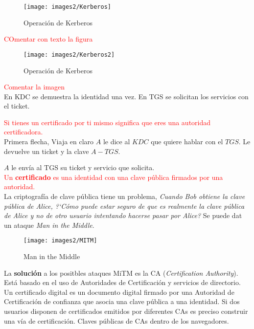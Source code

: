 \documentclass[10pt,portrait, twocolumn]{article}
\begin{document}
	\begin{figure}[ht!]
	\centering
	\texttt{[image: images2/Kerberos]}
	\caption{Operación de Kerberos}
	\label{figure:Planta1}
	\end{figure}
	
\textcolor{red}{COmentar con texto la figura}
	
		\begin{figure}[ht!]
	\centering
	\texttt{[image: images2/Kerberos2]}
	\caption{Operación de Kerberos}
	\label{figure:Planta1}
	\end{figure}
	
\textcolor{red}{Comentar la imagen}\\

En KDC se demuestra la identidad una vez. En TGS se solicitan los servicios con el ticket.

\textcolor{red}{Si tienes un certificado por ti mismo significa que eres una autoridad certificadora.}\\

Primera flecha, Viaja en claro $A$ le dice al $KDC$ que quiere hablar con el $TGS$. Le devuelve un ticket y la clave $A-TGS$.

\quad $A$ le envía al TGS su ticket y servicio que solicita.\\

\textcolor{red}{Un \textbf{certificado} es una identidad con una clave pública firmados por una autoridad.}\\

La criptografía de clave pública tiene un problema, \textit{Cuando Bob obtiene la clave pública de Alice, ?`Cómo puede estar seguro de que es realmente la clave pública de Alice y no de otro usuario intentando hacerse pasar por Alice?} Se puede dat un ataque \textit{Man in the Middle}.

\begin{figure}[ht!]
	\centering
	\texttt{[image: images2/MITM]}
	\caption{Man in the Middle}
	\label{figure:Planta1}
	\end{figure}

La \textbf{solución} a los positbles ataques MiTM es la CA (\textit{Certification Authority}). Está basado en el uso de Autoridades de Certificación y servicios de directorio. Un certificado digital es un documento digital firmado por una Autoridad de Certificación de confianza que asocia una clave pública a una identidad. Si dos usuarios disponen de certificados emitidos por diferentes CAs es preciso construir una vía de certificación. Claves públicas de CAs dentro de los navegadores.
\end{document}
